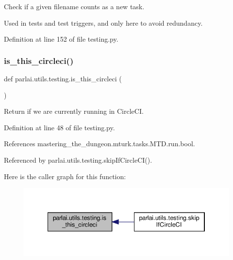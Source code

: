 \begin{DoxyVerb}Check if a given filename counts as a new task.

Used in tests and test triggers, and only here to avoid redundancy.
\end{DoxyVerb}
 

Definition at line 152 of file testing.\+py.

\mbox{\label{namespaceparlai_1_1utils_1_1testing_a2b1aba8cb2afc498691840f4b8999420}} 
\subsubsection{\texorpdfstring{is\+\_\+this\+\_\+circleci()}{is\_this\_circleci()}}
{\footnotesize\ttfamily def parlai.\+utils.\+testing.\+is\+\_\+this\+\_\+circleci (\begin{DoxyParamCaption}{ }\end{DoxyParamCaption})}

\begin{DoxyVerb}Return if we are currently running in CircleCI.\end{DoxyVerb}
 

Definition at line 48 of file testing.\+py.



References mastering\+\_\+the\+\_\+dungeon.\+mturk.\+tasks.\+M\+T\+D.\+run.\+bool.



Referenced by parlai.\+utils.\+testing.\+skip\+If\+Circle\+C\+I().

Here is the caller graph for this function\+:
\nopagebreak
\begin{figure}[H]
\begin{center}
\leavevmode
\includegraphics[width=334pt]{namespaceparlai_1_1utils_1_1testing_a2b1aba8cb2afc498691840f4b8999420_icgraph}
\end{center}
\end{figure}
\mbox{\label{namespaceparlai_1_1utils_1_1testing_a056ab7a9ad687500924a29001a7d9264}} 
